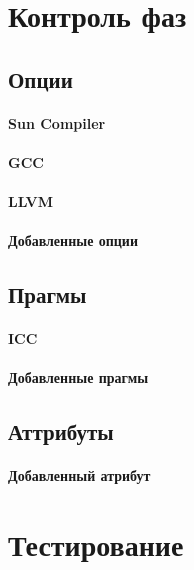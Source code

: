 \documentclass[12pt,a4paper]{article}
\begin{document}
\section{Контроль фаз}

\subsection{Опции}

\paragraph{Sun Compiler}

\paragraph{GCC}

\paragraph{LLVM}

\paragraph{Добавленные опции}

\subsection{Прагмы}

\paragraph{ICC}

\paragraph{Добавленные прагмы}

\subsection{Аттрибуты}

\paragraph{Добавленный атрибут}

\section{Тестирование}
\end{document}
